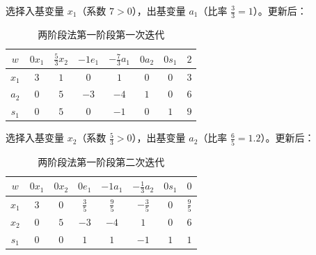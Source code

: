 \documentclass[12pt]{article}
\theoremstyle{plain}
\theoremstyle{definition}
\begin{document}
选择入基变量 $x_1$（系数 $7 > 0$），出基变量 $a_1$（比率 $\frac{3}{3} = 1$）。更新后：
\begin{table}[!htbp]
    \centering
    \caption{两阶段法第一阶段第一次迭代}
    \begin{tabular}{c|cccccc|c}
        \hline
        $w$ & $0x_1$ & $\frac{5}{3}x_2$ & $-1e_1$ & $-\frac{7}{3}a_1$ & $0a_2$ & $0s_1$ & $2$ \\
        \hline
        $x_1$ & $3$ & $1$ & $0$ & $1$ & $0$ & $0$ & $3$ \\
        $a_2$ & $0$ & $5$ & $-3$ & $-4$ & $1$ & $0$ & $6$ \\
        $s_1$ & $0$ & $5$ & $0$ & $-1$ & $0$ & $1$ & $9$ \\
        \hline
    \end{tabular}
\end{table}

选择入基变量 $x_2$（系数 $\frac{5}{3} > 0$），出基变量 $a_2$（比率 $\frac{6}{5} = 1.2$）。更新后：
\begin{table}[!htbp]
    \centering
    \caption{两阶段法第一阶段第二次迭代}
    \begin{tabular}{c|cccccc|c}
        \hline
        $w$ & $0x_1$ & $0x_2$ & $0e_1$ & $-1a_1$ & $-\frac{1}{3}a_2$ & $0s_1$ & $0$ \\
        \hline
        $x_1$ & $3$ & $0$ & $\frac{3}{5}$ & $\frac{9}{5}$ & $-\frac{3}{5}$ & $0$ & $\frac{9}{5}$ \\
        $x_2$ & $0$ & $5$ & $-3$ & $-4$ & $1$ & $0$ & $6$ \\
        $s_1$ & $0$ & $0$ & $1$ & $1$ & $-1$ & $1$ & $1$ \\
        \hline
    \end{tabular}
\end{table}
\end{document}
